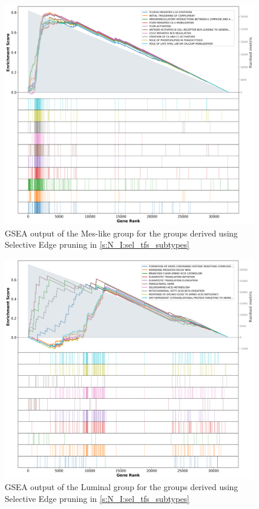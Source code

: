 \begin{figure}[!htb]
    \centering
    \includegraphics[width=\textwidth,keepaspectratio]{Sections/Network_I/Resources/selective_pruning/gsea/mesLike_10_top_manTerms.png}
    \caption{GSEA output of the Mes-like group for the groups derived using Selective Edge pruning in  \cref{s:N_I:sel_tfs_subtypes}}
    \label{fig:ap:gsea_mesLike}
\end{figure}

\begin{figure}[!htb]
    \centering
    \includegraphics[width=\textwidth,keepaspectratio]{Sections/Network_I/Resources/selective_pruning/gsea/largeLuminal_10_top_manTerms.png}
    \caption{GSEA output of the Luminal group for the groups derived using Selective Edge pruning in  \cref{s:N_I:sel_tfs_subtypes}}
    \label{fig:ap:gsea_largeLuminal}
\end{figure}

